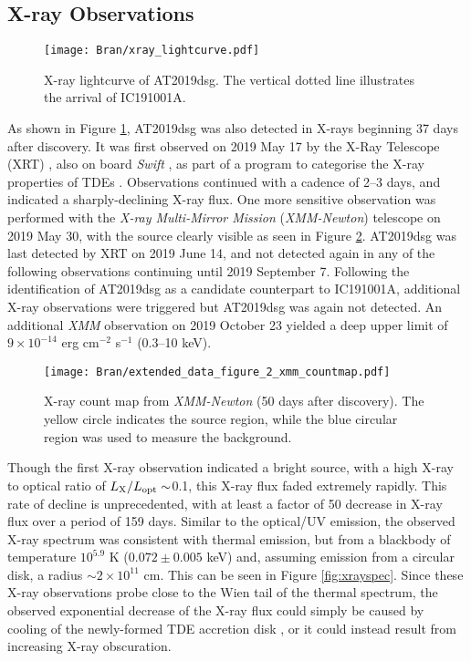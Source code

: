 \subsection*{X-ray Observations}

\begin{figure}[!ht]
	\texttt{[image: Bran/xray\_lightcurve.pdf]}
	\caption{X-ray lightcurve of AT2019dsg. The vertical dotted line illustrates the arrival of IC191001A.}
	\label{fig:bran_xray_lightcurve}
\end{figure}

As shown in Figure \ref{fig:bran_xray_lightcurve}, AT2019dsg was also detected in X-rays beginning 37 days after discovery. It was first observed on 2019 May 17 by the X-Ray Telescope (XRT) , also on board \textit{Swift} , as part of a program to categorise the X-ray properties of TDEs \cite{van_velzen_20}. Observations continued with a cadence of 2--3 days, and indicated a sharply-declining X-ray flux. One more sensitive observation was performed with the \textit{X-ray Multi-Mirror Mission} (\textit{XMM-Newton}) telescope  on 2019 May 30, with the source clearly visible as seen in Figure \ref{fig:xraymap}. AT2019dsg was last detected by XRT on 2019 June 14, and not detected again in any of the following observations continuing until 2019 September 7. Following the identification of AT2019dsg as a candidate counterpart to IC191001A, additional X-ray observations were triggered but AT2019dsg was again not detected. An additional \textit{XMM} observation on 2019 October 23 yielded a deep upper limit of $9 \times 10^{-14}$ erg cm$^{-2}$ s$^{-1}$ (0.3--10 keV). 

\begin{figure}[!ht]
	\texttt{[image: Bran/extended\_data\_figure\_2\_xmm\_countmap.pdf]}
	\caption{X-ray count map from \textit{XMM-Newton} (50 days after discovery). The yellow circle indicates the source region, while the blue circular region was used to measure the background.}
	\label{fig:xraymap}
\end{figure}

Though the first X-ray observation indicated a bright source, with a high X-ray to optical ratio of $L_{\textup{X}}/L_{\textup{opt}} \sim $0.1, this X-ray flux faded extremely rapidly. This rate of decline is unprecedented, with at least a factor of 50 decrease in X-ray flux over a period of 159 days. Similar to the optical/UV emission, the observed X-ray spectrum was consistent with thermal emission, but from a blackbody of temperature $10^{5.9}$ K ($0.072 \pm 0.005$ keV) and, assuming emission from a circular disk, a radius $\sim 2 \times 10^{11}$ cm. This can be seen in Figure \ref{fig:xrayspec}. Since these X-ray observations probe close to the Wien tail of the thermal spectrum, the observed exponential decrease of the X-ray flux could simply be caused by cooling of the newly-formed TDE accretion disk  , or it could instead result from increasing X-ray obscuration.

